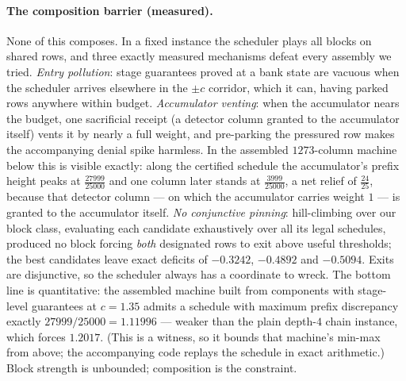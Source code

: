 \documentclass[11pt]{article}
\theoremstyle{definition}
\begin{document}
\paragraph{The composition barrier (measured).}
None of this composes.  In a fixed instance the scheduler plays all
blocks on shared rows, and three exactly measured mechanisms defeat every
assembly we tried.  \emph{Entry pollution}: stage guarantees proved at a
bank state are vacuous when the scheduler arrives elsewhere in the
$\pm c$ corridor, which it can, having parked rows anywhere within
budget.  \emph{Accumulator venting}: when the accumulator nears the
budget, one sacrificial receipt (a detector column granted to the
accumulator itself) vents it by nearly a full weight, and pre-parking the
pressured row makes the accompanying denial spike harmless.  In the
assembled $1273$-column machine below this is visible exactly: along the
certified schedule the accumulator's prefix height peaks at
$\tfrac{27999}{25000}$ and one column later stands at
$\tfrac{3999}{25000}$, a net relief of $\tfrac{24}{25}$, because that
detector column --- on which the accumulator carries weight $1$ --- is
granted to the accumulator itself.  \emph{No conjunctive pinning}:
hill-climbing over our block class, evaluating each candidate exhaustively
over all its legal schedules, produced no block forcing \emph{both}
designated rows to exit above useful thresholds; the best candidates leave
exact deficits of $-0.3242$, $-0.4892$ and $-0.5094$.  Exits are
disjunctive, so the scheduler always has a coordinate to wreck.  The
bottom line is
quantitative: the assembled machine built from components with
stage-level guarantees at $c=1.35$ admits a schedule with maximum prefix
discrepancy exactly $27999/25000=1.11996$ --- weaker than the plain
depth-$4$ chain instance, which forces $1.2017$.  (This is a witness, so
it bounds that machine's min-max from above; the accompanying code replays
the schedule in exact arithmetic.)  Block strength is unbounded;
composition is the constraint.
\end{document}
